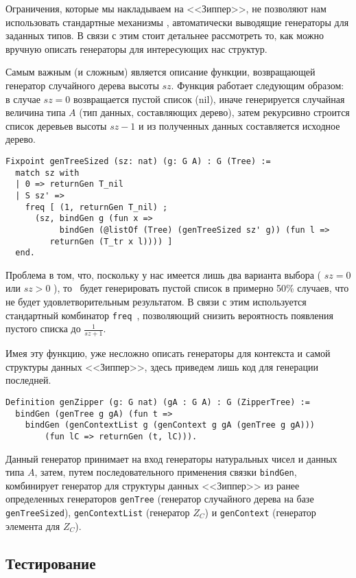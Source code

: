 Ограничения, которые мы накладываем на <<Зиппер>>, не позволяют нам использовать стандартные механизмы \tqc, автоматически выводящие генераторы для заданных типов. В связи с этим стоит детальнее рассмотреть то, как можно вручную описать генераторы для интересующих нас структур.

Самым важным (и сложным) является описание функции, возвращающей генератор случайного дерева высоты $sz$. Функция работает следующим образом: в случае $sz  = 0$ возвращается пустой список (nil), иначе генерируется случайная величина типа $A$ (тип данных, составляющих дерево), затем рекурсивно строится список деревьев высоты $sz - 1$ и из полученных данных составляется исходное дерево.

\begin{Verbatim}[fontsize=\small]
Fixpoint genTreeSized (sz: nat) (g: G A) : G (Tree) :=
  match sz with
  | 0 => returnGen T_nil
  | S sz' =>
    freq [ (1, returnGen T_nil) ;
      (sz, bindGen g (fun x =>
           bindGen (@listOf (Tree) (genTreeSized sz' g)) (fun l =>
         returnGen (T_tr x l)))) ]
  end.
\end{Verbatim}

Проблема в том, что, поскольку у нас имеется лишь два варианта выбора ( $sz = 0$ или $sz > 0$ ), то \tqc~будет генерировать пустой список в примерно 50\% случаев, что не будет удовлетворительным результатом. В связи с этим используется стандартный комбинатор \texttt{freq}~\autocite{QuickChickRM}, позволяющий снизить вероятность появления пустого списка до $\frac{1}{sz + 1}$.

Имея эту функцию, уже несложно описать генераторы для контекста и самой структуры данных <<Зиппер>>, здесь приведем лишь код для генерации последней.
\begin{Verbatim}[fontsize=\small]
Definition genZipper (g: G nat) (gA : G A) : G (ZipperTree) :=
  bindGen (genTree g gA) (fun t =>
    bindGen (genContextList g (genContext g gA (genTree g gA)))
    	(fun lC => returnGen (t, lC))).
\end{Verbatim}

Данный генератор принимает на вход генераторы натуральных чисел и данных типа $A$, затем, путем последовательного применения связки \texttt{bindGen}, комбинирует генератор для структуры данных <<Зиппер>> из ранее определенных генераторов \texttt{genTree} (генератор случайного дерева на базе \texttt{genTreeSized}), \texttt{genContextList} (генератор $Z_C$) и \texttt{genContext} (генератор элемента для $Z_C$).

\subsection{Тестирование}

